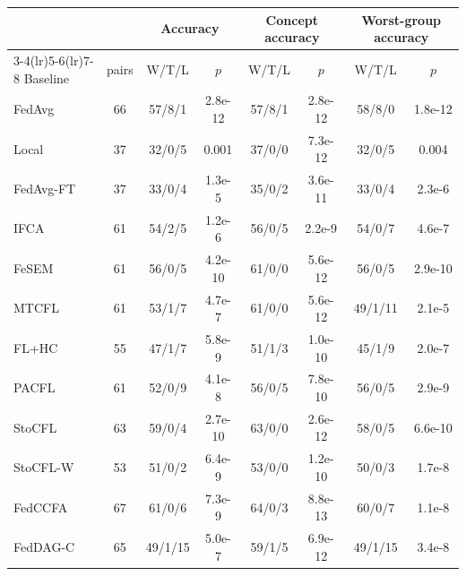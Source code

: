\small
\begin{tabular}{lccccccc}
\toprule
& & \multicolumn{2}{c}{Accuracy} & \multicolumn{2}{c}{Concept accuracy} & \multicolumn{2}{c}{Worst-group accuracy} \\
\cmidrule(lr){3-4}\cmidrule(lr){5-6}\cmidrule(lr){7-8}
Baseline & pairs & W/T/L & $p$ & W/T/L & $p$ & W/T/L & $p$ \\
\midrule
FedAvg & 66 & 57/8/1 & 2.8e-12 & 57/8/1 & 2.8e-12 & 58/8/0 & 1.8e-12 \\
Local & 37 & 32/0/5 & 0.001 & 37/0/0 & 7.3e-12 & 32/0/5 & 0.004 \\
FedAvg-FT & 37 & 33/0/4 & 1.3e-5 & 35/0/2 & 3.6e-11 & 33/0/4 & 2.3e-6 \\
IFCA & 61 & 54/2/5 & 1.2e-6 & 56/0/5 & 2.2e-9 & 54/0/7 & 4.6e-7 \\
FeSEM & 61 & 56/0/5 & 4.2e-10 & 61/0/0 & 5.6e-12 & 56/0/5 & 2.9e-10 \\
MTCFL & 61 & 53/1/7 & 4.7e-7 & 61/0/0 & 5.6e-12 & 49/1/11 & 2.1e-5 \\
FL+HC & 55 & 47/1/7 & 5.8e-9 & 51/1/3 & 1.0e-10 & 45/1/9 & 2.0e-7 \\
PACFL & 61 & 52/0/9 & 4.1e-8 & 56/0/5 & 7.8e-10 & 56/0/5 & 2.9e-9 \\
StoCFL & 63 & 59/0/4 & 2.7e-10 & 63/0/0 & 2.6e-12 & 58/0/5 & 6.6e-10 \\
StoCFL-W & 53 & 51/0/2 & 6.4e-9 & 53/0/0 & 1.2e-10 & 50/0/3 & 1.7e-8 \\
FedCCFA & 67 & 61/0/6 & 7.3e-9 & 64/0/3 & 8.8e-13 & 60/0/7 & 1.1e-8 \\
FedDAG-C & 65 & 49/1/15 & 5.0e-7 & 59/1/5 & 6.9e-12 & 49/1/15 & 3.4e-8 \\
\bottomrule
\end{tabular}
